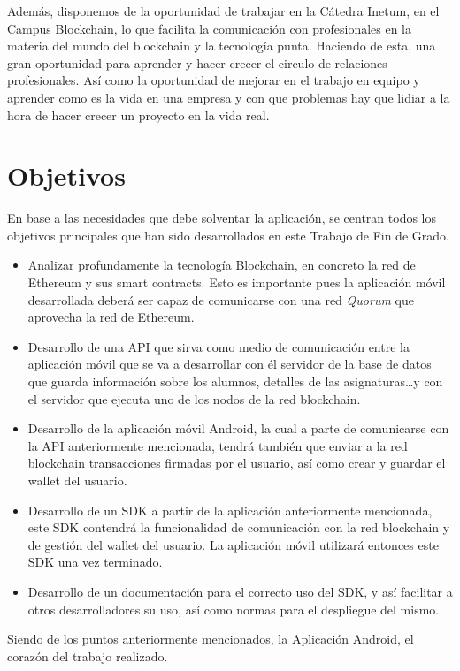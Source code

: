 Además, disponemos de la oportunidad de trabajar en la Cátedra Inetum, en el Campus Blockchain, lo que facilita la comunicación con profesionales en la materia del mundo del blockchain y la tecnología punta. Haciendo de esta, una gran oportunidad para aprender y hacer crecer el circulo de relaciones profesionales. Así como la oportunidad de mejorar en el trabajo en equipo y aprender como es la vida en una empresa y con que problemas hay que lidiar a la hora de hacer crecer un proyecto en la vida real.

\section{Objetivos}

En base a las necesidades que debe solventar la aplicación, se centran todos los objetivos principales que han sido desarrollados en este Trabajo de Fin de Grado.
\begin{itemize}
\item Analizar profundamente la tecnología Blockchain, en concreto la red de Ethereum y sus smart contracts. Esto es importante pues la aplicación móvil desarrollada deberá ser capaz de comunicarse con una red \emph{Quorum} que aprovecha la red de Ethereum.
\item Desarrollo de una API que sirva como medio de comunicación entre la aplicación móvil que se va a desarrollar con él servidor de la base de datos que guarda información sobre los alumnos, detalles de las asignaturas\dots y con el servidor que ejecuta uno de los nodos de la red blockchain. 
\item Desarrollo de la aplicación móvil Android, la cual a parte de comunicarse con la API anteriormente mencionada, tendrá también que enviar a la red blockchain transacciones firmadas por el usuario, así como crear y guardar el wallet del usuario. 
\item Desarrollo de un SDK a partir de la aplicación anteriormente mencionada, este SDK contendrá la funcionalidad de comunicación con la red blockchain y de gestión del wallet del usuario. La aplicación móvil utilizará entonces este SDK una vez terminado. 
\item Desarrollo de un documentación para el correcto uso del SDK, y así facilitar a otros desarrolladores su uso, así como normas para el despliegue del mismo. 
\end{itemize}
Siendo de los puntos anteriormente mencionados, la Aplicación Android, el corazón del trabajo realizado.

